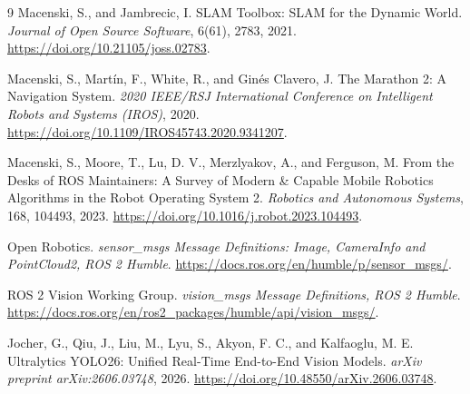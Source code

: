 \documentclass[UTF8,zihao=-4]{ctexart}
\begin{document}
\begin{thebibliography}{9}
Macenski, S., and Jambrecic, I.
SLAM Toolbox: SLAM for the Dynamic World.
\emph{Journal of Open Source Software}, 6(61), 2783, 2021.
\url{https://doi.org/10.21105/joss.02783}.

Macenski, S., Martín, F., White, R., and Ginés Clavero, J.
The Marathon 2: A Navigation System.
\emph{2020 IEEE/RSJ International Conference on Intelligent Robots and Systems (IROS)}, 2020.
\url{https://doi.org/10.1109/IROS45743.2020.9341207}.

Macenski, S., Moore, T., Lu, D. V., Merzlyakov, A., and Ferguson, M.
From the Desks of ROS Maintainers: A Survey of Modern \& Capable Mobile Robotics Algorithms in the Robot Operating System 2.
\emph{Robotics and Autonomous Systems}, 168, 104493, 2023.
\url{https://doi.org/10.1016/j.robot.2023.104493}.

Open Robotics.
\emph{sensor\_msgs Message Definitions: Image, CameraInfo and PointCloud2, ROS 2 Humble}.
\url{https://docs.ros.org/en/humble/p/sensor_msgs/}.

ROS 2 Vision Working Group.
\emph{vision\_msgs Message Definitions, ROS 2 Humble}.
\url{https://docs.ros.org/en/ros2_packages/humble/api/vision_msgs/}.

Jocher, G., Qiu, J., Liu, M., Lyu, S., Akyon, F. C., and Kalfaoglu, M. E.
Ultralytics YOLO26: Unified Real-Time End-to-End Vision Models.
\emph{arXiv preprint arXiv:2606.03748}, 2026.
\url{https://doi.org/10.48550/arXiv.2606.03748}.
\end{thebibliography}
\end{document}
